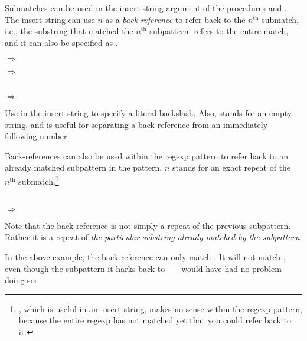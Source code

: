 Submatches can be used in the insert string argument of the procedures
 and .  The insert string
can use \code{\textbackslash}$n$ as a \emph{back-reference} to refer
back to the $n^\textrm{th}$ submatch, i.e., the substring that matched
the $n^\textrm{th}$ subpattern.   refers to
the entire match, and it can also be specified as
\code{\textbackslash\&}.

$\Rightarrow$ 

$\Rightarrow$ 

 \\
$\Rightarrow$ 

Use \code{\textbackslash\textbackslash} in the insert string to
specify a literal backslash.  Also, \code{\textbackslash\$} stands for
an empty string, and is useful for separating a back-reference
 from an immediately following number.

Back-references can also be used within the regexp pattern to refer
back to an already matched subpattern in the pattern.
\code{\textbackslash}$n$ stands for an exact repeat of the
$n^\textrm{th}$ submatch.\footnote{, which is
  useful in an insert string, makes no sense within the regexp
  pattern, because the entire regexp has not matched yet that you
  could refer back to it.}

 \\
$\Rightarrow$ 

Note that the back-reference is not simply a repeat of the previous
subpattern.  Rather it is a repeat of \emph{the particular substring
  already matched by the subpattern}.

In the above example, the back-reference can only match
.  It will not match , even though the
subpattern it harks back to---\code{([a-z]+)}---would have had no
problem doing so:

